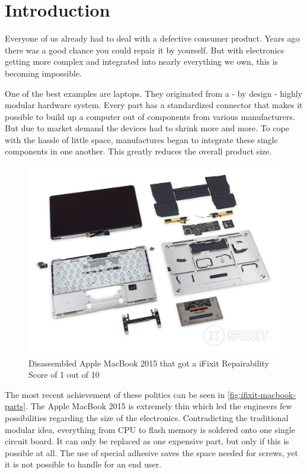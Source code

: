 
\chapter{Introduction}

	Everyone of us already had to deal with a defective consumer product. Years ago there was a good chance you could repair it by yourself. But with electronics getting more complex and integrated into nearly everything we own, this is becoming impossible.
	
	One of the best examples are laptops. They originated from a - by design - highly modular hardware system. Every part has a standardized connector that makes it possible to build up a computer out of components from various manufacturers. But due to market demand the devices had to shrink more and more. To cope with the hassle of little space, manufactures began to integrate these single components in one another. This greatly reduces the overall product size.
	
	\begin{figure}[H]
		\includegraphics[width=\textwidth]{../images/ifixit-macbook-parts.jpg}
		\centering
		\caption[Disassembled Apple MacBook 2015 that got a iFixit Repairability Score of 1 out of 10]{Disassembled Apple MacBook 2015 that got a iFixit Repairability Score of 1 out of 10\footnotemark}
		\label{fig:ifixit-macbook-parts}
	\end{figure}
	
	The most recent achievement of these politics can be seen in \autoref{fig:ifixit-macbook-parts}. The Apple MacBook 2015 is extremely thin which led the engineers few possibilities regarding the size of the electronics. Contradicting the traditional modular idea, everything from CPU to flash memory is soldered onto one single circuit board. It can only be replaced as one expensive part, but only if this is possible at all. The use of special adhesive saves the space needed for screws, yet it is not possible to handle for an end user.
	
